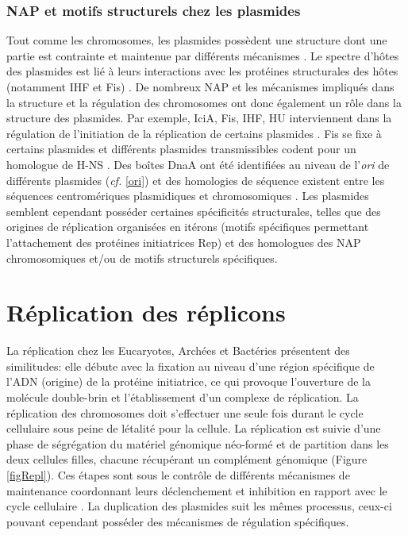 		
\subsubsection{NAP et motifs structurels chez les plasmides}\label{motif}
	Tout comme les chromosomes, les plasmides possèdent une structure dont une partie est contrainte et maintenue par différents mécanismes \citep{higgins2004topological}. Le spectre d'hôtes des plasmides est lié à leurs interactions avec les protéines structurales des hôtes (notamment IHF et Fis) \citep{DelSolar1996,Toukdarian2004}. De nombreux NAP et les mécanismes impliqués dans la structure et la régulation des chromosomes ont donc également un rôle dans la structure des plasmides. Par exemple, IciA, Fis, IHF, HU interviennent dans la régulation de l'initiation de la réplication de certains plasmides \citep{Kruger2004,DelSolar1998}. Fis se fixe à certains plasmides \citep{Rimsky2011} et différents plasmides transmissibles codent pour un homologue de H-NS \citep{Browning2010}. Des boîtes DnaA ont été identifiées au niveau de l'\textit{ori} de différents plasmides (\textit{cf.} \ref{ori}) et des homologies de séquence existent entre les séquences centromériques plasmidiques et chromosomiques \citep{Livny2007,Mierzejewska2012}. Les plasmides semblent cependant posséder certaines spécificités structurales, telles que des origines de réplication organisées en itérons (motifs spécifiques permettant l'attachement des protéines initiatrices Rep) et des homologues des NAP chromosomiques et/ou de motifs structurels spécifiques.    


\section{Réplication des réplicons}
	La réplication chez les Eucaryotes, Archées et Bactéries présentent des similitudes: elle débute avec la fixation au niveau d'une région spécifique de l'ADN (origine) de la protéine initiatrice, ce qui provoque l'ouverture de la molécule double-brin et l'établissement d'un complexe de réplication. La réplication des chromosomes doit s'effectuer une seule fois durant le cycle cellulaire sous peine de létalité pour la cellule. La réplication est suivie d'une phase de ségrégation du matériel génomique néo-formé et de partition dans les deux cellules filles, chacune récupérant un complément génomique  (Figure \ref{figRepl}). Ces étapes sont sous le contrôle de différents mécanismes de maintenance coordonnant leurs déclenchement et inhibition en rapport avec le cycle cellulaire \citep{thanbichler2010,OSullivan2011}. La duplication des plasmides suit les mêmes processus, ceux-ci pouvant cependant posséder des mécanismes de régulation spécifiques.
	
